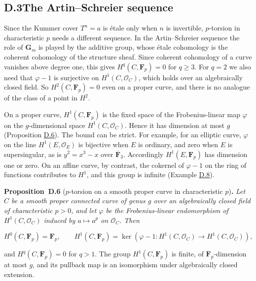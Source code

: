\documentclass[11pt]{article}
\newenvironment{bpstatement}[2]{\par\addvspace{0.6\baselineskip}\noindent\textbf{#1}#2\textbf{.}\enspace\ignorespaces}
  {\par\addvspace{0.4\baselineskip}}
\newenvironment{bpstatementit}[2]{\begin{bpstatement}{#1}{#2}\itshape\ignorespaces}{\end{bpstatement}}
\begin{document}
\subsection*{\texorpdfstring{D.3\quad The Artin–Schreier sequence}{D.3 The Artin–Schreier sequence}}
\label{bp18}%
\label{bp19}%
Since the Kummer cover \(T^n=a\) is étale only when \(n\) is invertible, \(p\)-torsion in characteristic \(p\) needs a different sequence. In the Artin–Schreier sequence the role of \(\mathbf G_m\) is played by the additive group, whose étale cohomology is the coherent cohomology of the structure sheaf. Since coherent cohomology of a curve vanishes above degree one, this gives \(H^q(C,\mathbf F_p)=0\) for \(q\geq3\). For \(q=2\) we also need that \(\varphi-1\) is surjective on \(H^1(C,\mathcal O_C)\), which holds over an algebraically closed field. So \(H^2(C,\mathbf F_p)=0\) even on a proper curve, and there is no analogue of the class of a point in \(H^2\).

On a proper curve, \(H^1(C,\mathbf F_p)\) is the fixed space of the Frobenius-linear map \(\varphi\) on the \(g\)-dimensional space \(H^1(C,\mathcal O_C)\). Hence it has dimension at most \(g\) (Proposition \hyperref[bp20]{D.6}). The bound can be strict. For example, for an elliptic curve, \(\varphi\) on the line \(H^1(E,\mathcal O_E)\) is bijective when \(E\) is ordinary, and zero when \(E\) is supersingular, as is \(y^2=x^3-x\) over \(\overline{\mathbf F}_3\). Accordingly \(H^1(E,\mathbf F_p)\) has dimension one or zero. On an affine curve, by contrast, the cokernel of \(\varphi-1\) on the ring of functions contributes to \(H^1\), and this group is infinite (Example \hyperref[bp26]{D.8}).

\label{bp20}%
\begin{bpstatementit}{Proposition~D.6}{ ($p$-torsion on a smooth proper curve in characteristic $p$)}
Let \(C\) be a smooth proper connected curve of genus \(g\) over an algebraically closed field of characteristic \(p>0\), and let \(\varphi\) be the Frobenius-linear endomorphism of \(H^1(C,\mathcal O_C)\) induced by \(a\mapsto a^p\) on \(\mathcal O_C\).  Then

\[
H^0(C,\mathbf F_p)=\mathbf F_p,\qquad
H^1(C,\mathbf F_p)=
\ker(\varphi-1:H^1(C,\mathcal O_C)\to H^1(C,\mathcal O_C)),
\]

and \(H^q(C,\mathbf F_p)=0\) for \(q>1\).  The group \(H^1(C,\mathbf F_p)\) is finite, of \(\mathbf F_p\)-dimension at most \(g\), and its pullback map is an isomorphism under algebraically closed extension.
\end{bpstatementit}
\end{document}
